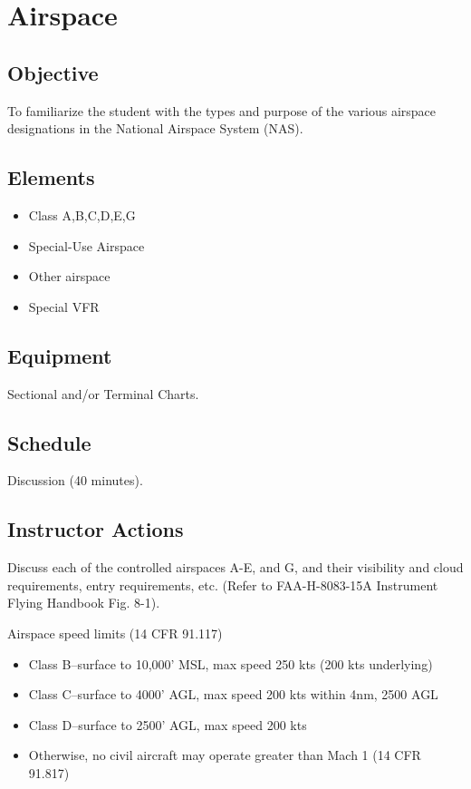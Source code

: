 \section{Airspace}

\subsection{Objective}

To familiarize the student with the types and purpose of the various airspace
designations in the National Airspace System (NAS).

\subsection{Elements}

\begin{itemize}
  \item Class A,B,C,D,E,G
  \item Special-Use Airspace
  \item Other airspace
  \item Special VFR
\end{itemize}

\subsection{Equipment}

Sectional and/or Terminal Charts.

\subsection{Schedule}

Discussion (40 minutes).

\subsection{Instructor Actions}

Discuss each of the controlled airspaces A-E, and G, and their visibility and
cloud requirements, entry requirements, etc. (Refer to FAA-H-8083-15A
Instrument Flying Handbook Fig. 8-1).

Airspace speed limits (14 CFR 91.117)
\begin{itemize}
  \item Class B--surface to 10,000' MSL, max speed 250 kts (200 kts underlying)
  \item Class C--surface to 4000' AGL, max speed 200 kts within 4nm, 2500 AGL
  \item Class D--surface to 2500' AGL, max speed 200 kts
  \item Otherwise, no civil aircraft may operate greater than Mach 1 (14 CFR
    91.817)
\end{itemize}

